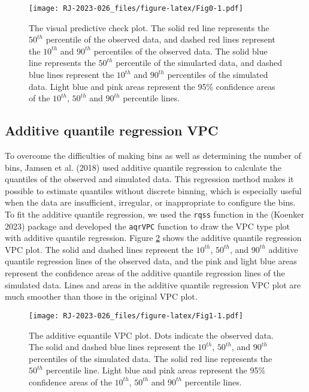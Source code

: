 \begin{figure}
\centering
\texttt{[image: RJ-2023-026\_files/figure-latex/Fig0-1.pdf]}
\caption{\label{fig:Fig0}The visual predictive check plot. The solid red line represents the \(50^{th}\) percentile of the observed data, and dashed red lines represent the \(10^{th}\) and \(90^{th}\) percentiles of the observed data. The solid blue line represents the \(50^{th}\) percentile of the simularted data, and dashed blue lines represent the \(10^{th}\) and \(90^{th}\) percentiles of the simulated data. Light blue and pink areas represent the 95\% confidence areas of the \(10^{th}\), \(50^{th}\) and \(90^{th}\) percentile lines.}
\end{figure}

\hypertarget{additive-quantile-regression-vpc}{%
\subsection{Additive quantile regression VPC}\label{additive-quantile-regression-vpc}}

To overcome the difficulties of making bins as well as determining the number of bins,
Jamsen et al. (2018) used additive quantile regression to calculate the quantiles of the observed and simulated data. This regression method makes it possible to estimate quantiles without discrete binning, which is especially useful when the data are insufficient, irregular, or inappropriate to configure the bins. To fit the additive quantile regression, we used the \texttt{rqss} function in the  (Koenker 2023) package and developed the \texttt{aqrVPC} function to draw the VPC type plot with additive quantile regression. Figure \ref{fig:Fig1} shows the additive quantile regression VPC plot. The solid and dashed lines represent the \(10^{th}\), \(50^{th}\), and \(90^{th}\) additive quantile regression lines of the observed data, and the pink and light blue areas represent the confidence areas of the additive quantile regression lines of the simulated data. Lines and areas in the additive quantile regression VPC plot are much smoother than those in the original VPC plot.

\begin{figure}
\centering
\texttt{[image: RJ-2023-026\_files/figure-latex/Fig1-1.pdf]}
\caption{\label{fig:Fig1}The additive equantile VPC plot. Dots indicate the observed data. The solid and dashed blue lines represent the \(10^{th}\), \(50^{th}\), and \(90^{th}\) percentiles of the simulated data. The solid red line represents the \(50^{th}\) percentile line. Light blue and pink areas represent the 95\% confidence areas of the \(10^{th}\), \(50^{th}\) and \(90^{th}\) percentile lines.}
\end{figure}

